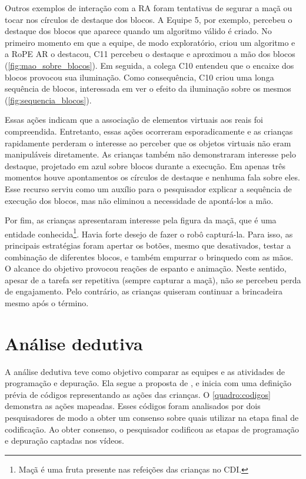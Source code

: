 Outros exemplos de interação com a RA foram tentativas de segurar a maçã ou tocar nos círculos de destaque dos blocos. A Equipe 5, por exemplo, percebeu o destaque dos blocos que aparece quando um algoritmo válido é criado. No primeiro momento em que a equipe, de modo exploratório, criou um algoritmo e a RoPE AR o destacou, C11 percebeu o destaque e aproximou a mão dos blocos (\autoref{fig:mao_sobre_blocos}). Em seguida, a colega C10 entendeu que o encaixe dos blocos provocou sua iluminação. Como consequência, C10 criou uma longa sequência de blocos, interessada em ver o efeito da iluminação sobre os mesmos  (\autoref{fig:sequencia_blocos}).

Essas ações indicam que a associação de elementos virtuais aos reais foi compreendida. Entretanto, essas ações ocorreram esporadicamente e as crianças rapidamente perderam o interesse ao perceber que os objetos virtuais não eram manipuláveis diretamente. As crianças também não demonstraram interesse pelo destaque, projetado em azul sobre blocos durante a execução. Em apenas três momentos houve apontamentos os círculos de destaque e nenhuma fala sobre eles. Esse recurso serviu como um auxílio para o pesquisador explicar a sequência de execução dos blocos, mas não eliminou a necessidade de apontá-los a mão.

Por fim, as crianças apresentaram interesse pela figura da maçã, que é uma entidade conhecida\footnote{Maçã é uma fruta presente nas refeições das crianças no CDI.}. Havia forte desejo de fazer o robô capturá-la. Para isso, as principais estratégias foram apertar os botões, mesmo que desativados, testar a combinação de diferentes blocos, e também empurrar o brinquedo com as mãos. O alcance do objetivo provocou reações de espanto e animação. Neste sentido, apesar de a tarefa ser repetitiva (sempre capturar a maçã), não se percebeu perda de engajamento. Pelo contrário, as crianças quiseram continuar a brincadeira mesmo após o término.

\section{Análise dedutiva}

A análise dedutiva teve como objetivo comparar as equipes e as atividades de programação e depuração. Ela segue a proposta de , e inicia com uma definição prévia de códigos representando as ações das crianças. O \autoref{quadro:codigos} demonstra as ações mapeadas. Esses códigos foram analisados por dois pesquisadores de modo a obter um consenso sobre quais utilizar na etapa final de codificação. Ao obter consenso, o pesquisador codificou as etapas de programação e depuração captadas nos vídeos.

